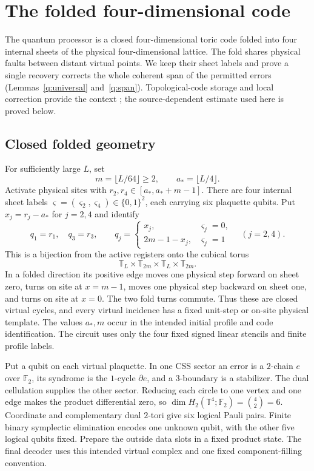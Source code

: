 \section{The folded four-dimensional code}\label{sec:folded}

The quantum processor is a closed four-dimensional toric code folded
into four internal sheets of the physical four-dimensional lattice.
The fold shares physical faults between distant virtual points. We
keep their sheet labels and prove a single recovery corrects the
whole coherent span of the permitted errors (Lemmas~\ref{q:universal}
and~\ref{q:span}). Topological-code
storage and local correction provide the context
\cite{BDL2026,DKLP2002,Harrington2004,KubicaPreskill2019}; the
source-dependent estimate used here is proved below.

\subsection{Closed folded geometry}\label{q:geometry}

For sufficiently large \(L\), set
\[
 m=\lfloor L/64\rfloor\ge2,\qquad a_*=\lfloor L/4\rfloor.
\]
Activate physical sites with
\(r_2,r_4\in[a_*,a_*+m-1]\). There are four internal sheet labels
\(\varsigma=(\varsigma_2,\varsigma_4)\in\{0,1\}^2\), each carrying six
plaquette qubits. Put \(x_j=r_j-a_*\) for \(j=2,4\) and identify
\begin{equation}\label{q:fold-map}
 q_1=r_1,\quad q_3=r_3,\qquad
 q_j=\begin{cases}x_j,&\varsigma_j=0,\\
                   2m-1-x_j,&\varsigma_j=1\end{cases}
 \quad(j=2,4).
\end{equation}
This is a bijection from the active registers onto the cubical torus
\[
 \mathbb T_L\times\mathbb T_{2m}\times
 \mathbb T_L\times\mathbb T_{2m}.
\]
In a folded direction its positive edge moves one physical step
forward on sheet zero, turns on site at \(x=m-1\), moves one physical
step backward on sheet one, and turns on site at \(x=0\). The two
fold turns commute. Thus these are closed virtual cycles, and every
virtual incidence has a fixed unit-step or on-site physical template.
The values \(a_*,m\) occur in the intended initial profile and code
identification. The circuit uses only the four fixed signed linear
stencils and finite profile labels.

Put a qubit on each virtual plaquette. In one CSS sector an error is
a \(2\)-chain \(e\) over \(\mathbb F_2\), its syndrome is the
\(1\)-cycle \(\partial e\), and a \(3\)-boundary is a stabilizer.
The dual cellulation supplies the other sector. Reducing each circle
to one vertex and one edge makes the product differential zero, so
\(\dim H_2(\mathbb T^4;\mathbb F_2)=\binom42=6\).
Coordinate and complementary dual \(2\)-tori give six logical Pauli
pairs. Finite binary symplectic elimination encodes one unknown
qubit, with the other five logical qubits fixed. Prepare the outside
data slots in a fixed product state. The final decoder uses this
intended virtual complex and one fixed component-filling convention.

